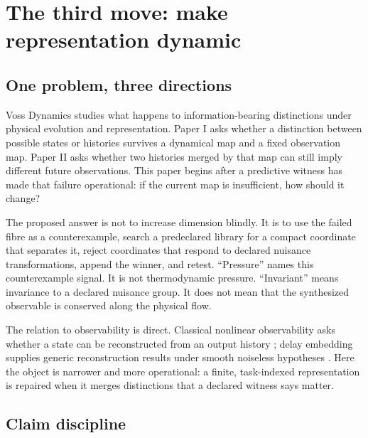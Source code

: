\documentclass[10pt]{article}
\theoremstyle{definition}
\theoremstyle{remark}
\begin{document}
\setcounter{tocdepth}{1}
{\small\tableofcontents}
\clearpage

\section{The third move: make representation dynamic}

\subsection{One problem, three directions}

Voss Dynamics studies what happens to information-bearing distinctions under physical evolution and representation. Paper I asks whether a distinction between possible states or histories survives a dynamical map and a fixed observation map. Paper II asks whether two histories merged by that map can still imply different future observations. This paper begins after a predictive witness has made that failure operational: if the current map is insufficient, how should it change?

The proposed answer is not to increase dimension blindly. It is to use the failed fibre as a counterexample, search a predeclared library for a compact coordinate that separates it, reject coordinates that respond to declared nuisance transformations, append the winner, and retest. ``Pressure'' names this counterexample signal. It is not thermodynamic pressure. ``Invariant'' means invariance to a declared nuisance group. It does not mean that the synthesized observable is conserved along the physical flow.

The relation to observability is direct. Classical nonlinear observability asks whether a state can be reconstructed from an output history \citep{HermannKrener1977}; delay embedding supplies generic reconstruction results under smooth noiseless hypotheses \citep{Takens1981,Sauer1991}. Here the object is narrower and more operational: a finite, task-indexed representation is repaired when it merges distinctions that a declared witness says matter.

\subsection{Claim discipline}
\end{document}
